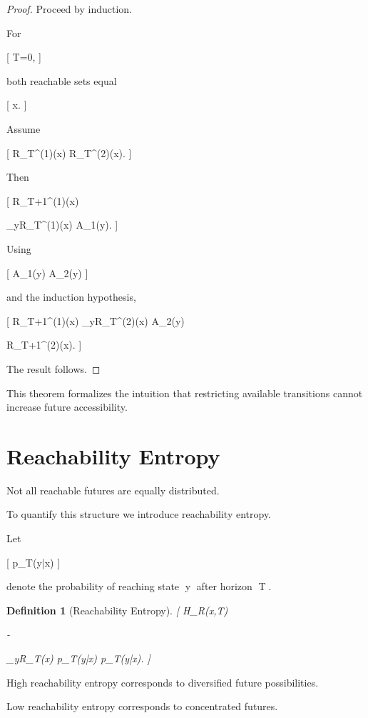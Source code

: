 \documentclass[11pt,oneside,openany]{book}
\newtheorem{definition}{Definition}[chapter] \newtheorem{theorem}{Theorem}[chapter] \newtheorem{proposition}{Proposition}[chapter] \newtheorem{lemma}{Lemma}[chapter] \newtheorem{corollary}{Corollary}[chapter] \newtheorem{remark}{Remark}[chapter]
\begin{document}
\begin{proof}

Proceed by induction.

For

[
T=0,
]

both reachable sets equal

[
{x}.
]

Assume

[
R_T^{(1)}(x)
\subseteq
R_T^{(2)}(x).
]

Then

[
R_{T+1}^{(1)}(x)

\bigcup_{y\in R_T^{(1)}(x)}
A_1(y).
]

Using

[
A_1(y)
\subseteq
A_2(y)
]

and the induction hypothesis,

[
R_{T+1}^{(1)}(x)
\subseteq
\bigcup_{y\in R_T^{(2)}(x)}
A_2(y)

R_{T+1}^{(2)}(x).
]

The result follows.

\end{proof}

This theorem formalizes the intuition that restricting available transitions cannot increase future accessibility.

\section{Reachability Entropy}

Not all reachable futures are equally distributed.

To quantify this structure we introduce reachability entropy.

Let

[
p_T(y|x)
]

denote the probability of reaching state y after horizon T.

\begin{definition}[Reachability Entropy]

[
H_R(x,T)

- 

\sum_{y\in R_T(x)}
p_T(y|x)
\log p_T(y|x).
]

\end{definition}

High reachability entropy corresponds to diversified future possibilities.

Low reachability entropy corresponds to concentrated futures.
\end{document}
